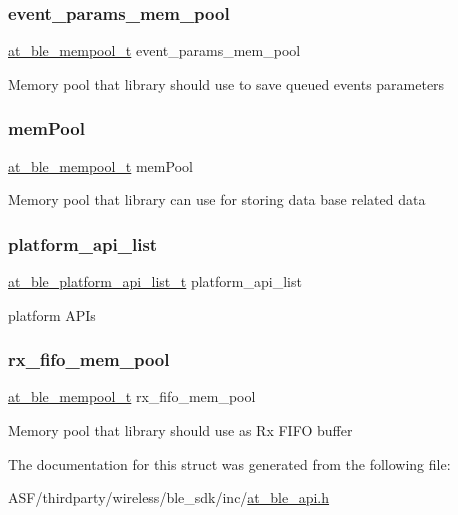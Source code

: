 \subsubsection{\texorpdfstring{event\_params\_mem\_pool}{event\_params\_mem\_pool}}
{\footnotesize\ttfamily \mbox{\hyperlink{structat__ble__mempool__t}{at\+\_\+ble\+\_\+mempool\+\_\+t}} event\+\_\+params\+\_\+mem\+\_\+pool}

Memory pool that library should use to save queued events parameters \mbox{\label{structat__ble__init__config__t_a107945f763d61e260b5e81af7c0fef42}} 
\subsubsection{\texorpdfstring{memPool}{memPool}}
{\footnotesize\ttfamily \mbox{\hyperlink{structat__ble__mempool__t}{at\+\_\+ble\+\_\+mempool\+\_\+t}} mem\+Pool}

Memory pool that library can use for storing data base related data \mbox{\label{structat__ble__init__config__t_a87f8bbe544ee7aa0848f7af1cf2bee69}} 
\subsubsection{\texorpdfstring{platform\_api\_list}{platform\_api\_list}}
{\footnotesize\ttfamily \mbox{\hyperlink{at__ble__api_8h_a8cb09712407255776fc9e2917a4b10c8}{at\+\_\+ble\+\_\+platform\+\_\+api\+\_\+list\+\_\+t}} platform\+\_\+api\+\_\+list}

platform A\+P\+Is \mbox{\label{structat__ble__init__config__t_a010b3c9a7ee5ed3f204e2c0e35be5c0a}} 
\subsubsection{\texorpdfstring{rx\_fifo\_mem\_pool}{rx\_fifo\_mem\_pool}}
{\footnotesize\ttfamily \mbox{\hyperlink{structat__ble__mempool__t}{at\+\_\+ble\+\_\+mempool\+\_\+t}} rx\+\_\+fifo\+\_\+mem\+\_\+pool}

Memory pool that library should use as Rx F\+I\+FO buffer 

The documentation for this struct was generated from the following file\+:\begin{DoxyCompactItemize}
\item 
A\+S\+F/thirdparty/wireless/ble\+\_\+sdk/inc/\mbox{\hyperlink{at__ble__api_8h}{at\+\_\+ble\+\_\+api.\+h}}\end{DoxyCompactItemize}
